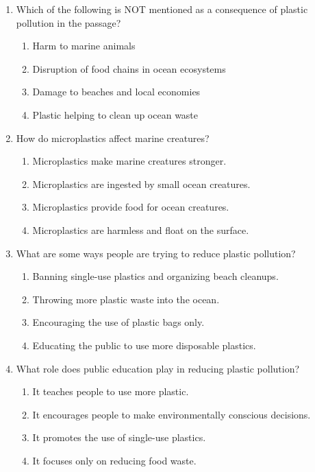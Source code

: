 \documentclass[12pt]{article}
\begin{document}
\begin{enumerate}
    \vspace{0.5cm}

    \item Which of the following is NOT mentioned as a consequence of plastic pollution in the passage?
    \begin{enumerate}[label=\Alph*.]
        \item Harm to marine animals
        \item Disruption of food chains in ocean ecosystems
        \item Damage to beaches and local economies
        \item Plastic helping to clean up ocean waste
    \end{enumerate}

    \vspace{0.5cm}

    \item How do microplastics affect marine creatures?
    \begin{enumerate}[label=\Alph*.]
        \item Microplastics make marine creatures stronger.
        \item Microplastics are ingested by small ocean creatures.
        \item Microplastics provide food for ocean creatures.
        \item Microplastics are harmless and float on the surface.
    \end{enumerate}

    \vspace{0.5cm}

    \item What are some ways people are trying to reduce plastic pollution?
    \begin{enumerate}[label=\Alph*.]
        \item Banning single-use plastics and organizing beach cleanups.
        \item Throwing more plastic waste into the ocean.
        \item Encouraging the use of plastic bags only.
        \item Educating the public to use more disposable plastics.
    \end{enumerate}

    \vspace{0.5cm}

    \item What role does public education play in reducing plastic pollution?
    \begin{enumerate}[label=\Alph*.]
        \item It teaches people to use more plastic.
        \item It encourages people to make environmentally conscious decisions.
        \item It promotes the use of single-use plastics.
        \item It focuses only on reducing food waste.
    \end{enumerate}


\end{enumerate}
\end{document}

